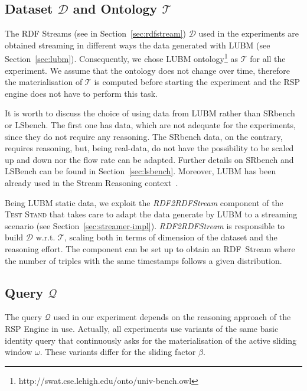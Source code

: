 \subsection{Dataset $\mathcal{D}$ and Ontology $\mathcal{T}$}\label{sec:dataset}
%
%
The RDF Streams (see in Section~\ref{sec:rdfstream}) $\mathcal{D}$ used in the experiments are obtained streaming in different ways the data generated with LUBM (see Section~\ref{sec:lubm}). Consequently, we chose LUBM ontology\footnote{http://swat.cse.lehigh.edu/onto/univ-bench.owl} as $\mathcal{T}$ for all the experiment. We assume that the ontology does not change over time, therefore the materialisation of $\mathcal{T}$ is computed before starting the experiment and the RSP engine does not have to perform this task. 

It is worth to discuss the choice of using data from LUBM rather than SRbench or LSbench. The first one has data, which are not adequate for the experiments, since they do not require any reasoning. The SRbench data, on the contrary, requires reasoning, but, being real-data, do not have the possibility to be scaled up and down nor the flow rate can be adapted. Further details on SRbench and LSBench can be found in Section~\ref{sec:lsbench}. Moreover, LUBM has been already used in the Stream Reasoning context~\cite{DBLP:conf/semweb/UrbaniMJHB13}. 

Being LUBM static data, we exploit the \textit{RDF2RDFStream} component of the \textsc{Test Stand} that takes care to adapt the data generate by LUBM to a streaming scenario (see Section~\ref{sec:streamer-impl}). \textit{RDF2RDFStream} is responsible to build $\mathcal{D}$ w.r.t. $\mathcal{T}$, scaling both in terms of dimension of the dataset and the reasoning effort. The component can be set up to obtain an RDF~Stream where the number of triples with the same timestamps follows a given distribution. %

\subsection{Query $\mathcal{Q}$}\label{sec:query}
 
The query $\mathcal{Q}$ used in our experiment depends on the reasoning approach of the RSP Engine in use. Actually, all  experiments use variants of the same basic identity query that continuously asks for the materialisation of the active sliding window $\omega$. These variants differ for the sliding factor $\beta$.\\

